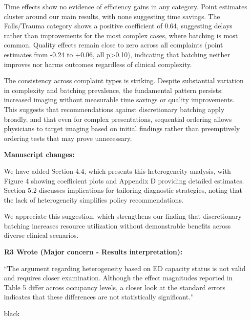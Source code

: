 \documentclass[11pt]{article}
\newenvironment{quote2}
{ \bigskip
\noindent
         \small\em
         \baselineskip=14pt
}
\newcommand{\1}{\hbox{\rm 1\kern-.35em 1}}
\begin{document}
Time effects show no evidence of efficiency gains in any category. Point estimates cluster around our main results, with none suggesting time savings. The Falls/Trauma category shows a positive coefficient of 0.64, suggesting delays rather than improvements for the most complex cases, where batching is most common. Quality effects remain close to zero across all complaints (point estimates from -0.24 to +0.06, all p>0.10), indicating that batching neither improves nor harms outcomes regardless of clinical complexity.

The consistency across complaint types is striking. Despite substantial variation in complexity and batching prevalence, the fundamental pattern persists: increased imaging without measurable time savings or quality improvements. This suggests that recommendations against discretionary batching apply broadly, and that even for complex presentations, sequential ordering allows physicians to target imaging based on initial findings rather than preemptively ordering tests that may prove unnecessary.

\textbf{Manuscript changes:}

We have added Section 4.4, which presents this heterogeneity analysis, with Figure 4 showing coefficient plots and Appendix D providing detailed estimates. Section 5.2 discusses implications for tailoring diagnostic strategies, noting that the lack of heterogeneity simplifies policy recommendations.

We appreciate this suggestion, which strengthens our finding that discretionary batching increases resource utilization without demonstrable benefits across diverse clinical scenarios.
\color{black}

\begin{quote2}
\textbf{R3 Wrote (Major concern -  Results interpretation):}  

\noindent``The argument regarding heterogeneity based on ED capacity status is not valid and requires closer examination. Although the effect magnitudes reported in Table 5 differ across occupancy levels, a closer look at the standard errors indicates that these differences are not statistically significant."


\end{quote2}



\color{black}
\end{document}

